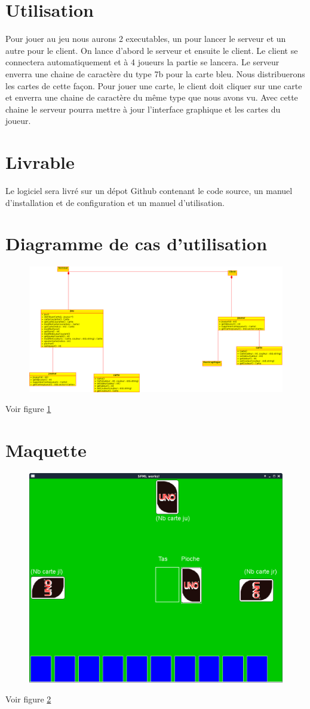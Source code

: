 \documentclass[french]{article}
\begin{document}
\section{Utilisation}

Pour jouer au jeu nous aurons 2 executables, un pour lancer le serveur et un autre pour le client.
On lance d'abord le serveur et ensuite le client. Le client se connectera automatiquement et à 4 joueurs la partie se lancera. Le serveur enverra une chaine de caractère du type \og 7b\fg{} pour la carte  bleu\fg{}. Nous distribuerons les cartes de cette façon. Pour jouer une carte, le client doit cliquer sur une carte et enverra une chaine de caractère du même type que nous avons vu. Avec cette chaine le serveur pourra mettre à jour l'interface graphique et les cartes du joueur.

\section{Livrable}
Le logiciel sera livré sur un dépot Github contenant le code source, un manuel d'installation et de configuration et un manuel d'utilisation.

\section{Diagramme de cas d'utilisation}
\begin{figure}
\centering
\includegraphics[width=0.7\linewidth]{class_diagram}
\caption{}
\label{classdiagram}
\end{figure}

Voir figure \ref{classdiagram}

\section{Maquette}
\begin{figure}
\centering
\includegraphics[width=0.7\linewidth]{"Screen maquette"}
\caption{}
\label{screen-maquette}
\end{figure}

Voir figure \ref{screen-maquette}
\end{document}
